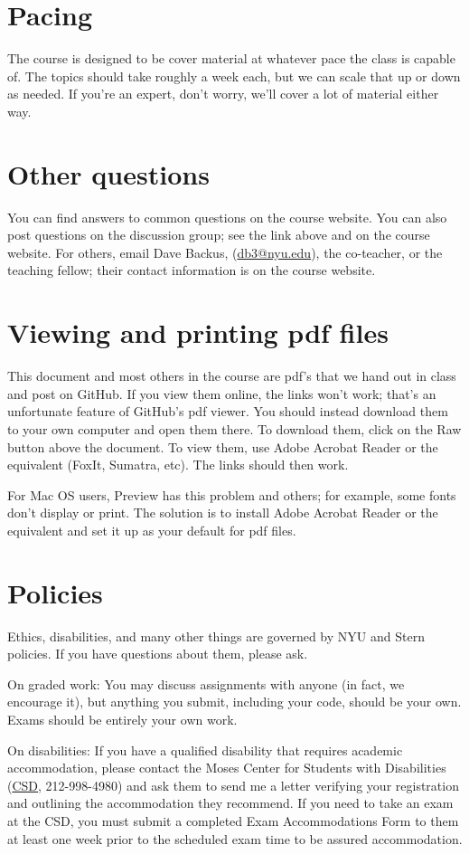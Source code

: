 \documentclass[11pt]{article}
\begin{document}
\section*{Pacing}


The course is designed to be cover material at whatever pace the class is capable of.
The topics should take roughly a week each, but we can scale that up or down as needed.
If you're an expert, don't worry, we'll cover a lot of material either way.


\section*{Other questions}

You can find answers to common questions on the course website.
You can also post questions on the discussion group;
see the link above and on the course website.
For others, email Dave Backus, (\href{mailto:db3@nyu.edu}{db3@nyu.edu}),
the co-teacher, or the teaching fellow; their contact information is on the course website.


\section*{Viewing and printing pdf files}

This document and most others in the course are pdf's that we hand out in class and post on GitHub.
If you view them online, the links won't work; that's an unfortunate feature of GitHub's pdf viewer.
You should instead download them to your own computer and open them there.
To download them,
click on the Raw button above the document.
To view them, use Adobe Acrobat Reader or the equivalent (FoxIt, Sumatra, etc).
The links should then work.

For Mac OS users, Preview has this problem and others; for example,
some fonts don't display or print.
The solution is to install Adobe Acrobat Reader or the equivalent
and set it up as your default for pdf files.


\section*{Policies}

Ethics, disabilities, and many other things are governed by NYU
and Stern policies.
If you have questions about them, please ask.

On graded work:
You may discuss assignments with anyone (in fact, we encourage it),
but anything you submit, including your code, should be your own.
Exams should be entirely your own work.

On disabilities:
If you have a qualified disability that requires academic accommodation,
please contact the Moses Center for Students with Disabilities
(\href{http://www.nyu.edu/life/safety-health-wellness/students-with-disabilities.html}{CSD},
212-998-4980) and ask them to
send me a letter verifying your registration and outlining the accommodation they recommend.
If you need to take an exam at the CSD,
you must submit a completed Exam Accommodations Form to them
at least one week prior to the scheduled exam time to be assured accommodation.



\end{document}
